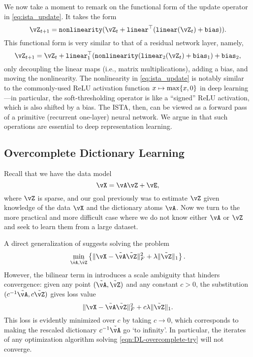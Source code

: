 \documentclass[../../book-main.tex]{subfiles}
\begin{document}
We now take a moment to remark on the functional form of the update operator in \eqref{eq:ista_update}. It takes the form 
\begin{equation}
    \vZ_{t + 1} = \texttt{nonlinearity}(\vZ_{t} + \texttt{linear}^{\top}(\texttt{linear}(\vZ_{t}) + \texttt{bias})).
\end{equation}
This functional form is very similar to that of a residual network layer, namely,
\begin{equation}
    \vZ_{t + 1} = \vZ_{t} + \texttt{linear}_{1}^{\top}(\texttt{nonlinearity}(\texttt{linear}_{2}(\vZ_{t}) + \texttt{bias}_{1}) + \texttt{bias}_{2},
\end{equation}
only decoupling the linear maps (i.e., matrix multiplications), adding a bias, and moving the nonlinearity. 
The nonlinearity in \eqref{eq:ista_update} is notably similar to the
commonly-used ReLU activation function $x \mapsto \max\set{x, 0}$ in deep
learning---in particular, the soft-thresholding operator is like a ``signed''
ReLU activation, which is also shifted by a bias.
The ISTA, then, can be viewed as a forward pass of a primitive (recurrent one-layer) neural network. We argue in  that such operations are essential to deep representation learning.




\subsection{Overcomplete Dictionary Learning} 

Recall that we have the data model 
\begin{equation}\label{eq:overcomplete-dl-section-data-model}
    \vX = \vA\vZ + \vE,
\end{equation}
where \(\vZ\) is sparse, and our goal previously was to estimate \(\vZ\) given
knowledge of the data \(\vX\) and the dictionary atoms \(\vA\). Now we turn to
the more practical and more difficult case where we do not know
either \(\vA\) or \(\vZ\) and seek to learn them from a large dataset. 

A direct generalization of  suggests solving the problem
\begin{equation}
    \min_{\tilde{\vA}, \tilde{\vZ}}\bc{\norm{\vX - \tilde{\vA}\tilde{\vZ}}_{F}^{2} + \lambda \norm{\tilde{\vZ}}_{1}}.
    \label{eqn:DL-overcomplete-try}
\end{equation}
However, the bilinear term in  introduces a scale
ambiguity that hinders convergence: given any point $(\tilde{\vA},
\tilde{\vZ})$ and any constant $c>0$, the substitution
$(c^{-1}\tilde{\vA}, c\tilde{\vZ})$ gives loss value
\begin{equation}
    \norm{\vX - \tilde{\vA}\tilde{\vZ}}_{F}^{2} + c\lambda \norm{\tilde{\vZ}}_{1}.
\end{equation}
This loss is evidently minimized over $c$ by taking $c \to 0$, which corresponds
to making the rescaled dictionary $c^{-1} \tilde{\vA}$ go `to infinity'. In
particular, the iterates of any optimization algorithm solving
\eqref{eqn:DL-overcomplete-try} will not converge.
\end{document}
